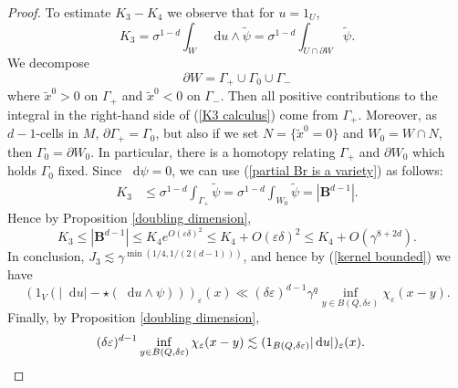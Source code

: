 \documentclass[reqno,12pt,letterpaper]{amsart}
\newcommand{\Ball}{\mathbf{B}}
\newcommand*\dif{\mathop{}\!\mathrm{d}}
\theoremstyle{definition}
\numberwithin{equation}{section}
\begin{document}
\begin{proof}
To estimate $K_3 - K_4$ we observe that for $u = 1_U$,
\begin{equation}\label{K3 calculus}
K_3 = \sigma^{1 - d} \int_W \dif u \wedge \tilde \psi = \sigma^{1 - d} \int_{U \cap \partial W} \tilde \psi.
\end{equation}
We decompose
$$\partial W = \Gamma_+ \cup \Gamma_0 \cup \Gamma_-$$
where $\tilde x^0 > 0$ on $\Gamma_+$ and $\tilde x^0 < 0$ on $\Gamma_-$. Then all positive contributions to the integral in the right-hand side of (\ref{K3 calculus}) come from $\Gamma_+$.
Moreover, as $d-1$-cells in $M$, $\partial \Gamma_+ = \Gamma_0$, but also if we set $N = \{\tilde x^0 = 0\}$ and $W_0 = W \cap N$, then $\Gamma_0 = \partial W_0$.
In particular, there is a homotopy relating $\Gamma_+$ and $\partial W_0$ which holds $\Gamma_0$ fixed.
Since $\dif \psi = 0$, we can use (\ref{partial Br is a variety}) as follows:
\begin{align*}
K_3 &\leq \sigma^{1 - d} \int_{\Gamma_+} \tilde \psi = \sigma^{1 - d} \int_{W_0} \tilde \psi = |\Ball^{d - 1}|.
\end{align*}
Hence by Proposition \ref{doubling dimension},
$$K_3 \leq |\Ball^{d - 1}| \leq K_4 e^{O(\varepsilon\delta)^2} \leq K_4 + O(\varepsilon\delta)^2 \leq K_4 + O(\gamma^{8 + 2d}).$$
In conclusion, $J_3 \lesssim \gamma^{\min(1/4, 1/(2(d - 1)))}$, and hence by (\ref{kernel bounded}) we have
$$(1_V(|\dif u| - \star(\dif u \wedge \psi)))_\varepsilon(x) \ll (\delta\varepsilon)^{d - 1} \gamma^q \inf_{y \in B(Q, \delta\varepsilon)} \chi_\varepsilon(x - y).$$
Finally, by Proposition \ref{doubling dimension},
\begin{align*}
(\delta\varepsilon)^{d - 1} \inf_{y \in B(Q, \delta\varepsilon)} \chi_\varepsilon(x - y) &\lesssim (1_{B(Q, \delta\varepsilon)} |\dif u|)_\varepsilon(x). \qedhere
\end{align*}
\end{proof}
\end{document}
